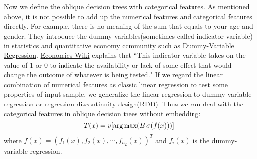 \documentclass[UTF8]{article}
\begin{document}
Now we define the oblique decision trees with categorical features.
As mentioned above, it is not possible to add up the numerical features and categorical features directly.
For example, there is no meaning of the sum that equals to your age and gender.
They introduce the dummy variables(sometimes called indicator variable) in statistics and quantitative economy community
such as \href{https://www.sagepub.com/sites/default/files/upm-binaries/21120_Chapter_7.pdf}{Dummy-Variable
Regression}.
\href{http://www.economicswiki.com/economics-tutorials/dummy-variable/}{Economics Wiki} explains that
``This indicator variable takes on the value of 1 or 0 to indicate the availability or lack of some effect
that would change the outcome of whatever is being tested."
If we regard the linear combination of numerical features as classic linear regression
to test some properties of input sample,
we generalize the linear regression to dummy-variable regression or regression discontinuity design(RDD).
Thus we can deal with the categorical features in oblique decision trees without embedding:
\begin{equation}\label{DTC}
T(x) =v[\arg\max(B\,\sigma(f(x)))] \\ \nonumber
\end{equation}
where $f(x)=(f_1(x), f_2(x), \cdots, f_{n_L}(x))^T$ and $f_{i}(x)$ is the dummy-variable regression.


\end{document}
